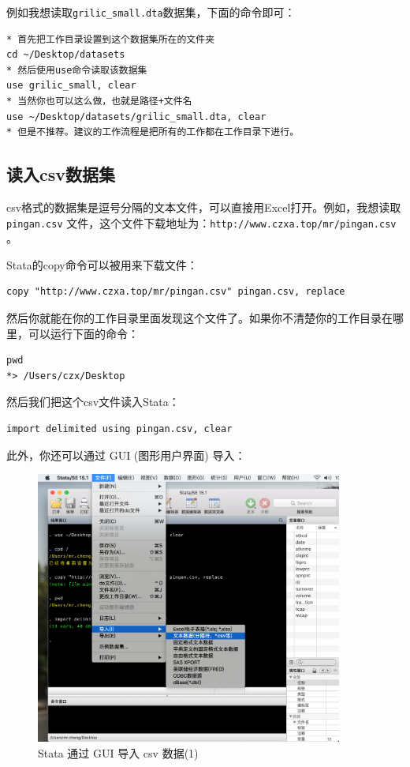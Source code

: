 例如我想读取\texttt{grilic\_small.dta}数据集，下面的命令即可：

\begin{lstlisting}
* 首先把工作目录设置到这个数据集所在的文件夹
cd ~/Desktop/datasets
* 然后使用use命令读取该数据集
use grilic_small, clear
* 当然你也可以这么做，也就是路径+文件名
use ~/Desktop/datasets/grilic_small.dta, clear
* 但是不推荐。建议的工作流程是把所有的工作都在工作目录下进行。
\end{lstlisting}

\subsection{读入csv数据集}
csv格式的数据集是逗号分隔的文本文件，可以直接用Excel打开。例如，我想读取 \texttt{pingan.csv} 文件，这个文件下载地址为：\texttt{http://www.czxa.top/mr/pingan.csv} 。

Stata的copy命令可以被用来下载文件：

\begin{lstlisting}
copy "http://www.czxa.top/mr/pingan.csv" pingan.csv, replace
\end{lstlisting}

然后你就能在你的工作目录里面发现这个文件了。如果你不清楚你的工作目录在哪里，可以运行下面的命令：

\begin{lstlisting}
pwd
*> /Users/czx/Desktop
\end{lstlisting}

然后我们把这个csv文件读入Stata：

\begin{lstlisting}
import delimited using pingan.csv, clear
\end{lstlisting}

此外，你还可以通过 GUI (图形用户界面) 导入：

\begin{figure}[htbp]
  \centering \includegraphics[width=0.9\textwidth]{assets/csvgui1.png}
  \caption{Stata 通过 GUI 导入 csv 数据(1)}
  \label{fig:csvgui1}
\end{figure}


